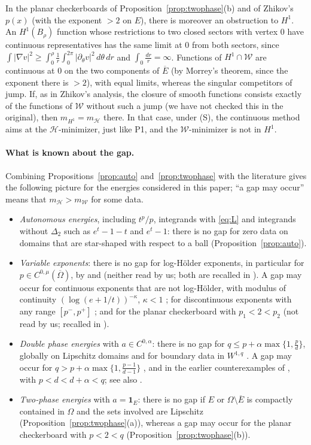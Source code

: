 \documentclass[11pt]{amsart}
\theoremstyle{definition}
\theoremstyle{remark}
\numberwithin{equation}{section}
\newcommand{\abs}[1]{\lvert #1\rvert}
\newcommand{\Wc}{\mathcal W}
\newcommand{\Hc}{\mathcal H}
\newcommand{\mW}{m_{\mathcal W}}
\newcommand{\mH}{m_{\mathcal H}}
\newcommand{\mHone}{m_{H^1}}
\begin{document}
In the planar checkerboards of Proposition~\ref{prop:twophase}(b) and of Zhikov's $p(x)$ (with the exponent $>2$ on $E$), there is moreover an obstruction to $H^1$. An $H^1(B_\rho)$ function whose restrictions to two closed sectors with vertex $0$ have continuous representatives has the same limit at $0$ from both sectors, since $\int\abs{\nabla v}^2\ge\int_0^\rho\frac1r\int_0^{2\pi}\abs{\partial_\theta v}^2\,d\theta\,dr$ and $\int_0\frac{dr}r=\infty$. Functions of $H^1\cap\Wc$ are continuous at $0$ on the two components of $\overline E$ (by Morrey's theorem, since the exponent there is $>2$), with equal limits, whereas the singular competitors of \cite{Zhikov1986,BDS2020} jump. If, as in Zhikov's analysis, the closure of smooth functions consists exactly of the functions of $\Wc$ without such a jump (we have not checked this in the original), then $\mHone=\mH$ there. In that case, under (S), the continuous method aims at the $\Hc$-minimizer, just like P1, and the $\Wc$-minimizer is not in $H^1$.

\paragraph{What is known about the gap.} Combining Propositions~\ref{prop:auto} and~\ref{prop:twophase} with the literature gives the following picture for the energies considered in this paper; ``a gap may occur'' means that $\mH>\mW$ for some data.
\begin{itemize}[leftmargin=1.5em]
\item \emph{Autonomous energies}, including $t^p/p$, integrands with \eqref{eq:L} and integrands without $\Delta_2$ such as $e^t-1-t$ and $e^t-1$: there is no gap for zero data on domains that are star-shaped with respect to a ball (Proposition~\ref{prop:auto}).
\item \emph{Variable exponents}: there is no gap for log-H\"older exponents, in particular for $p\in C^{0,\mu}(\overline\Omega)$, by \cite{Zhikov1995} and \cite[\S4.6]{DHHR2011} (neither read by us; both are recalled in \cite[p.~22]{BDS2020}). A gap may occur for continuous exponents that are not log-H\"older, with modulus of continuity $(\log(e+1/t))^{-\kappa}$, $\kappa<1$ \cite[Thm.~30]{BDS2020}; for discontinuous exponents with any range $[p^-,p^+]$ \cite[Thm.~29]{BDS2020}; and for the planar checkerboard with $p_1<2<p_2$ \cite{Zhikov1986} (not read by us; recalled in \cite[\S1.1]{BDS2020}).
\item \emph{Double phase energies} with $a\in C^{0,\alpha}$: there is no gap for $q\le p+\alpha\max\{1,\frac pd\}$, globally on Lipschitz domains and for boundary data in $W^{1,q}$ \cite[Thm.~2.3]{BGS2022}. A gap may occur for $q>p+\alpha\max\{1,\frac{p-1}{d-1}\}$ \cite[Thm.~32]{BDS2020}, and in the earlier counterexamples of \cite{ELM2004}, with $p<d<d+\alpha<q$; see also \cite{BCDM2024}.
\item \emph{Two-phase energies} with $a=\mathbf 1_E$: there is no gap if $E$ or $\Omega\setminus\overline E$ is compactly contained in $\Omega$ and the sets involved are Lipschitz (Proposition~\ref{prop:twophase}(a)), whereas a gap may occur for the planar checkerboard with $p<2<q$ (Proposition~\ref{prop:twophase}(b)).
\end{itemize}
\end{document}
